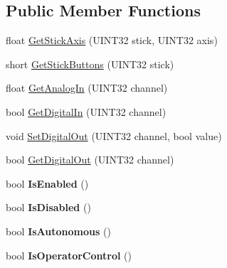 \subsection*{Public Member Functions}
\begin{DoxyCompactItemize}
\item 
float \hyperlink{classDriverStation_ae5e5fbb7b3c287825caee2654971bed3}{GetStickAxis} (UINT32 stick, UINT32 axis)
\item 
short \hyperlink{classDriverStation_a5a26a64a7f0a1016c24fef2af2514fbb}{GetStickButtons} (UINT32 stick)
\item 
float \hyperlink{classDriverStation_abf159102b44e03b26e006a777b96c5e5}{GetAnalogIn} (UINT32 channel)
\item 
bool \hyperlink{classDriverStation_ac41869035eacd80eb902534afdd944ed}{GetDigitalIn} (UINT32 channel)
\item 
void \hyperlink{classDriverStation_aa6f189f102414ed3abc4a04aa310bcf3}{SetDigitalOut} (UINT32 channel, bool value)
\item 
bool \hyperlink{classDriverStation_a492ef73cb147833e1acdc90188e16f4d}{GetDigitalOut} (UINT32 channel)
\item 
\hypertarget{classDriverStation_a7e0490ebe441784f803e09325436ac10}{
bool {\bfseries IsEnabled} ()}
\label{classDriverStation_a7e0490ebe441784f803e09325436ac10}

\item 
\hypertarget{classDriverStation_afcccb82207e0342596133e81dc7a047f}{
bool {\bfseries IsDisabled} ()}
\label{classDriverStation_afcccb82207e0342596133e81dc7a047f}

\item 
\hypertarget{classDriverStation_ae7f9794664d49a36b65a3cd4a6e6987b}{
bool {\bfseries IsAutonomous} ()}
\label{classDriverStation_ae7f9794664d49a36b65a3cd4a6e6987b}

\item 
\hypertarget{classDriverStation_a092c3018d93ff244bea1b6570a48054b}{
bool {\bfseries IsOperatorControl} ()}
\label{classDriverStation_a092c3018d93ff244bea1b6570a48054b}


\end{DoxyCompactItemize}
